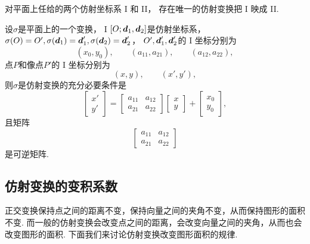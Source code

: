 \begin{corollary}
对平面上任给的两个仿射坐标系 I 和 II，
存在唯一的仿射变换把 I 映成 II.
\end{corollary}

\begin{theorem}
设\(\sigma\)是平面上的一个变换，
I \([O;\boldsymbol{d}_1,\boldsymbol{d}_2]\)是仿射坐标系，
\(
	\sigma(O) = O',
	\sigma(\boldsymbol{d}_1) = \boldsymbol{d}'_1,
	\sigma(\boldsymbol{d}_2) = \boldsymbol{d}'_2
\)，
\(O',\boldsymbol{d}'_1,\boldsymbol{d}'_2\)的 I 坐标分别为\begin{equation*}
	(x_0,y_0),
	\qquad
	(a_{11},a_{21}),
	\qquad
	(a_{12},a_{22}),
\end{equation*}
点\(P\)和像点\(P'\)的 I 坐标分别为\begin{equation*}
	(x,y),
	\qquad
	(x',y'),
\end{equation*}
则\(\sigma\)是仿射变换的充分必要条件是\begin{equation*}
	\begin{bmatrix}
		x' \\ y'
	\end{bmatrix}
	= \begin{bmatrix}
		a_{11} & a_{12} \\
		a_{21} & a_{22}
	\end{bmatrix}
	\begin{bmatrix}
		x \\ y
	\end{bmatrix}
	+ \begin{bmatrix}
		x_0 \\ y_0
	\end{bmatrix},
\end{equation*}
且矩阵\begin{equation*}
	\begin{bmatrix}
		a_{11} & a_{12} \\
		a_{21} & a_{22}
	\end{bmatrix}
\end{equation*}
是可逆矩阵.
\end{theorem}

\subsection{仿射变换的变积系数}
正交变换保持点之间的距离不变，保持向量之间的夹角不变，从而保持图形的面积不变.
而一般的仿射变换会改变点之间的距离，会改变向量之间的夹角，从而也会改变图形的面积.
下面我们来讨论仿射变换改变图形面积的规律.

